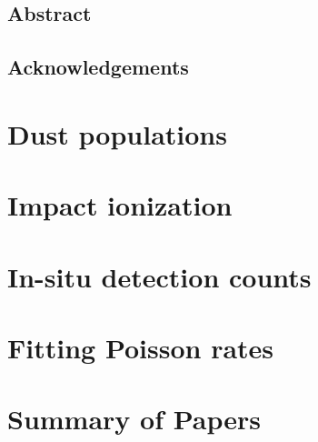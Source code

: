 \documentclass[11pt,twoside,openright]{book}
\begin{document}
\frontmatter


\newpage\null\thispagestyle{empty}\newpage

\setcounter{page}{1}\thispagestyle{empty}\newpage

\section*{Abstract}


\newpage\null\newpage
\section*{Acknowledgements}

\newpage\null\newpage

\tableofcontents

\mainmatter

\chapter{Dust populations}


\chapter{Impact ionization}


\chapter{In-situ detection counts}


\chapter{Fitting Poisson rates}


\chapter{Summary of Papers}\label{ch:sum-paper}


\end{document}
